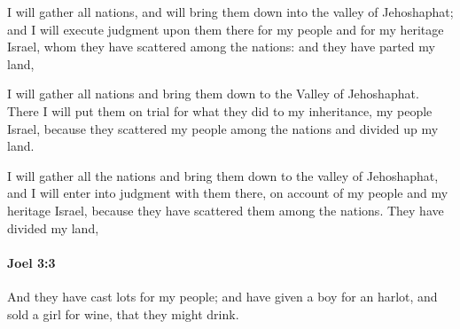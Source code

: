 			\begin{versebox}
					\item[BHS] 
					\item[LXX] 
					\item[ASV] I will gather all nations, and will bring them down into the valley of Jehoshaphat; and I will execute judgment upon them there for my people and for my heritage Israel, whom they have scattered among the nations: and they have parted my land,
					\item[NIV] I will gather all nations and bring them down to the Valley of Jehoshaphat. There I will put them on trial for what they did to my inheritance, my people Israel, because they scattered my people among the nations and divided up my land.
					\item[NRSV] I will gather all the nations and bring them down to the valley of Jehoshaphat, and I will enter into judgment with them there, on account of my people and my heritage Israel, because they have scattered them among the nations. They have divided my land,
			\end{versebox}

		\paragraph{Joel 3:3} %
			\label{JOEL-3-3}

			And they have cast lots for my people; and have given a boy for an harlot, and sold a girl for wine, that they might drink.


